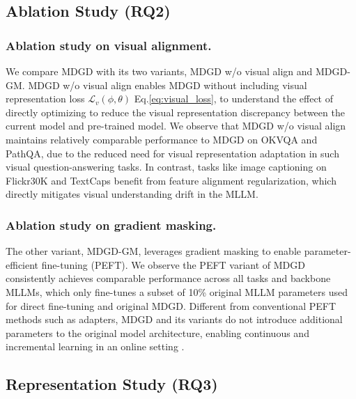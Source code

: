 





\subsection{Ablation Study (RQ2)}
\subsubsection{Ablation study on visual alignment.}
We compare MDGD with its two variants, MDGD w/o visual align and MDGD-GM.
MDGD w/o visual align enables MDGD without including visual representation loss $\mathcal{L}_v(\phi,\theta)$ Eq.\eqref{eq:visual_loss}, 
to understand the effect of directly optimizing to reduce the visual representation discrepancy between the current model and pre-trained model.
We observe that MDGD w/o visual align maintains relatively comparable  performance to MDGD on OKVQA and PathQA,
due to the reduced need for visual representation adaptation in such visual question-answering tasks.
In contrast, tasks like image captioning on Flickr30K and TextCaps benefit from feature alignment regularization, 
which directly mitigates visual understanding drift in the MLLM.

\subsubsection{Ablation study on gradient masking.}
The other variant, MDGD-GM, leverages gradient masking to enable parameter-efficient fine-tuning (PEFT).
We observe the PEFT variant of MDGD consistently achieves comparable performance across all tasks and backbone MLLMs,
which only fine-tunes a subset of 10\% original MLLM parameters used for direct fine-tuning and original MDGD. 
Different from conventional PEFT methods such as adapters, 
MDGD and its variants do not introduce additional parameters to the original model architecture, 
enabling continuous and incremental learning in an online setting \citep{maltoni2019continuous,gao2023llama}.

\subsection{Representation Study (RQ3)} \label{sec:repre}
